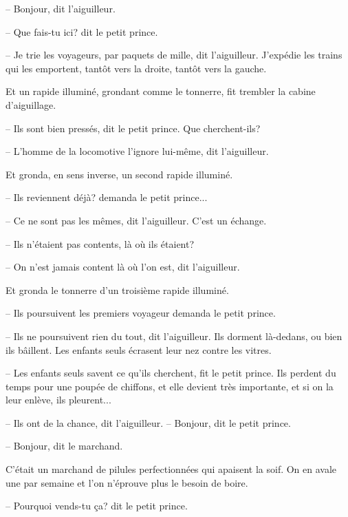\documentclass[a4paper]{report}
\begin{document}
-- Bonjour, dit l'aiguilleur.

-- Que fais-tu ici? dit le petit prince.

-- Je trie les voyageurs, par paquets de mille, dit l'aiguilleur. J'expédie les trains qui les emportent, tantôt vers la droite, tantôt vers la gauche.

Et un rapide illuminé, grondant comme le tonnerre, fit trembler la cabine d'aiguillage.

-- Ils sont bien pressés, dit le petit prince. Que cherchent-ils?

-- L'homme de la locomotive l'ignore lui-même, dit l'aiguilleur.

Et gronda, en sens inverse, un second rapide illuminé.

-- Ils reviennent déjà? demanda le petit prince...

-- Ce ne sont pas les mêmes, dit l'aiguilleur. C'est un échange.

-- Ils n'étaient pas contents, là où ils étaient?

-- On n'est jamais content là où l'on est, dit l'aiguilleur.

Et gronda le tonnerre d'un troisième rapide illuminé.

-- Ils poursuivent les premiers voyageur demanda le petit prince.

-- Ils ne poursuivent rien du tout, dit l'aiguilleur. Ils dorment là-dedans, ou bien ils bâillent. Les enfants seuls écrasent leur nez contre les vitres.

-- Les enfants seuls savent ce qu'ils cherchent, fit le petit prince. Ils perdent du temps pour une poupée de chiffons, et elle devient très importante, et si on la leur enlève, ils pleurent...

-- Ils ont de la chance, dit l'aiguilleur.
\parachapter[XXIII]{} %
-- Bonjour, dit le petit prince.

-- Bonjour, dit le marchand.

C'était un marchand de pilules perfectionnées qui apaisent la soif. On en avale une par semaine et l'on n'éprouve plus le besoin de boire.

-- Pourquoi vends-tu ça? dit le petit prince.
\end{document}
